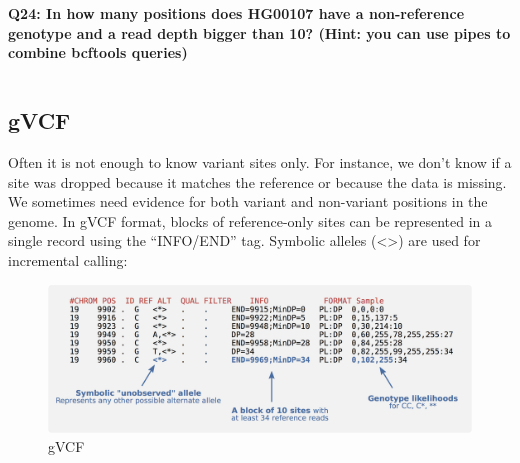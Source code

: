 \documentclass[11pt]{article}
\makeatletter
\newcommand{\boxspacing}{\kern\kvtcb@left@rule\kern\kvtcb@boxsep}
\newcommand{\prompt}[4]{
        \ttfamily\llap{{\color{#2}\LARGE\faKeyboardO\hspace{3pt}#4}}\vspace{-\baselineskip}
    }
\makeatother
\begin{document}
    \begin{tcolorbox}[breakable, size=fbox, boxrule=1pt, pad at break*=1mm,colback=cellbackground, colframe=cellborder]
\prompt{In}{incolor}{ }{\boxspacing}
\begin{Verbatim}[commandchars=\\\{\}]

\end{Verbatim}
\end{tcolorbox}

    \textbf{Q24: In how many positions does HG00107 have a non-reference
genotype and a read depth bigger than 10? (Hint: you can use pipes to
combine bcftools queries)}

    \begin{tcolorbox}[breakable, size=fbox, boxrule=1pt, pad at break*=1mm,colback=cellbackground, colframe=cellborder]
\prompt{In}{incolor}{ }{\boxspacing}
\begin{Verbatim}[commandchars=\\\{\}]

\end{Verbatim}
\end{tcolorbox}

    \hypertarget{gvcf}{%
\subsection{gVCF}\label{gvcf}}

Often it is not enough to know variant sites only. For instance, we
don't know if a site was dropped because it matches the reference or
because the data is missing. We sometimes need evidence for both variant
and non-variant positions in the genome. In gVCF format, blocks of
reference-only sites can be represented in a single record using the
``INFO/END'' tag. Symbolic alleles (\textless*\textgreater) are used for
incremental calling:

    \begin{figure}[!h]
\centering
\includegraphics{img/gVCF.png}
\caption{gVCF}
\end{figure}
\end{document}
